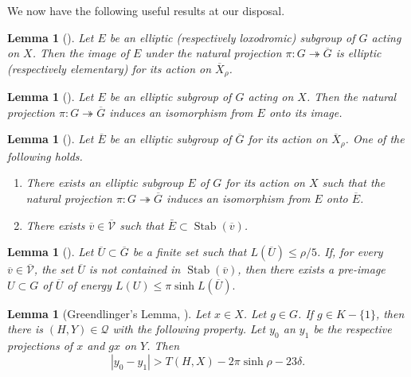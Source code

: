 \documentclass[leqno,a4paper,10pt]{amsart}
\theoremstyle{plain}
\newtheorem{lem}[thm]{Lemma}
\theoremstyle{definition}
\theoremstyle{remark}
\newcommand{\qG}{\overline{G}}
\newcommand{\q}[1]{\overline{#1}}
\newcommand{\stab}[1]{\operatorname{Stab}(#1)}
\newcommand{\scrQ}{\mathscr{Q}}
\newcommand{\scrV}{\mathscr{V}}
\newcommand{\onto}{\twoheadrightarrow}
\begin{document}
We now have the following useful results at our disposal. 

\begin{lem}[]
	\label{lem:quotient-elementary}
	Let $E$ be an elliptic (respectively loxodromic) subgroup of $G$ acting on $X$. Then the image of $E$ under the natural projection $\pi \colon  G\onto \q G$ is elliptic (respectively elementary) for its action on $\q X_{\rho}$.
\end{lem}

\begin{lem}[]
	\label{lem:quotient-elliptic}
	Let $E$ be an elliptic subgroup of $G$ acting on $X$. Then the natural projection $\pi \colon  G\onto \q G$ induces an isomorphism from $E$ onto its image.
\end{lem}

\begin{lem}[]
	\label{lem:lifting-elliptic-subgroups}
	Let $\q E$ be an elliptic subgroup of $\q G$ for its action on $\q X_{\rho}$.
	One of the following holds.
	\begin{enumerate}[label=(\roman*)]
		\item  There exists an elliptic subgroup $E$ of $G$ for its action on $X$ such that the natural projection $\pi\colon G \onto \q G$ induces an isomorphism from $E$ onto $\q E$.
		\item There exists $\q v \in \q{\scrV}$ such that $\bar E \subset \stab {\q v}$.
	\end{enumerate}
\end{lem}



\begin{lem}[]
	\label{lem:energy-lift} 
	Let $\q U \subset \qG$ be a finite set such that $L(\q U)\leqslant \rho/5$. If, for every $\q v\in \q {\scrV}$, the set $\q U$ is not contained in $\stab{\q v}$, then there exists a pre-image $U\subset G $ of $\q U$ of energy $L(U) \leqslant \pi \sinh L(\q U).$
\end{lem}

\begin{lem}[Greendlinger's Lemma, {\cite[Theorem~3.5]{coulon_detecting_2018}}]
	\label{lem:greendlingers-lemma}
	Let $x\in X$. Let $g\in G$. If $g\in K-\{1\}$, then there is $(H,Y)\in \scrQ$ with the following property. Let $y_0$ an $y_1$ be the respective projections of $x$ and $gx$ on $Y$. Then 
	$$|y_0-y_1|>T(H,X)-2\pi\sinh{\rho}-23\delta.$$
\end{lem}
\end{document}
